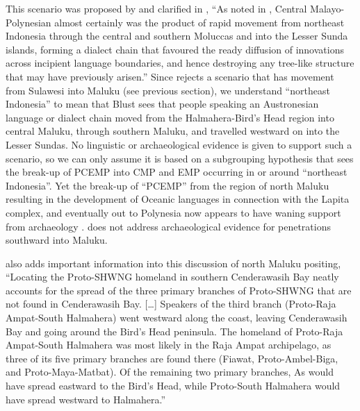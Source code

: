 This scenario was proposed by \citet{Blust1993}
and clarified in \citet[98]{Blust2008},
“As noted in \citet{Blust1993},
Central Malayo-Polynesian almost certainly was the product of
rapid movement from northeast Indonesia through the central
and southern Moluccas and into the Lesser Sunda islands,
forming a dialect chain that favoured the ready diffusion of
innovations across incipient language boundaries,
and hence destroying any tree-like structure that may have previously
arisen.” 
Since \citet{Blust2012b} rejects a scenario that has movement
from Sulawesi into Maluku (see previous section),
we understand “northeast Indonesia” to mean that Blust sees that
people speaking an Austronesian language or dialect chain moved
from the Halmahera-Bird’s Head region into central Maluku,
through southern Maluku, and travelled westward on into the Lesser Sundas.
No linguistic or archaeological evidence is given to support
such a scenario, so we can only assume it is based on a subgrouping hypothesis
that sees the break-up of PCEMP into CMP
and EMP occurring in or around “northeast Indonesia”.
Yet the break-up of “PCEMP” from the region of north Maluku resulting
in the development of Oceanic languages in connection with the
Lapita complex, and eventually out to Polynesia now appears to have
waning support from archaeology \citep[4]{Bellwood2019b}.
\citet{Bellwood2019b} does not address archaeological
evidence for penetrations southward into Maluku.

\citet[142]{Kamholz2014} also adds important information into
this discussion of north Maluku positing,
“Locating the Proto-SHWNG homeland in southern Cenderawasih Bay
neatly accounts for the spread of the three primary branches
of Proto-SHWNG that are not found in Cenderawasih Bay.
[{\ldots}] Speakers of the third branch (Proto-Raja Ampat-South Halmahera) went westward
along the coast, leaving Cenderawasih Bay and going around the Bird’s Head peninsula.
The homeland of Proto-Raja Ampat-South Halmahera was most likely in the Raja Ampat
archipelago, as three of its five primary branches are found there
(Fiawat, Proto-Ambel-Biga, and Proto-Ma{\Q}ya-Matbat).
Of the remaining two primary branches,
As would have spread eastward to the Bird’s Head,
while Proto-South Halmahera would have spread westward to Halmahera.”

